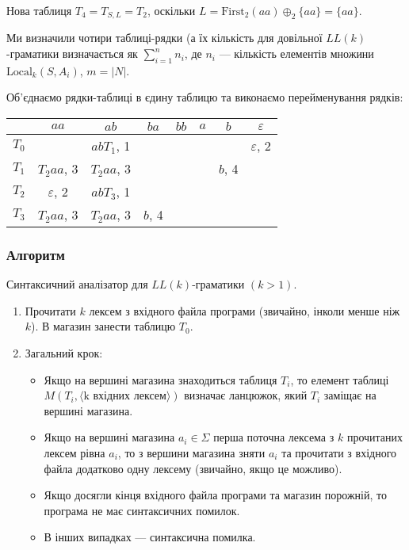Нова таблиця $T_4 = T_{S, L} = T_2$, оскільки $L = \text{First}_2(aa) \oplus_2 \{aa\} = \{aa\}$. \medskip

Ми визначили чотири таблиці-рядки (а їх кількість для довільної $LL(k)$-граматики визначається як $\sum_{i = 1}^n n_i$, де $n_i$ --- кількість елементів множини $\text{Local}_k(S, A_i)$, $m = \vert N\vert$. \medskip

Об'єднаємо рядки-таблиці в єдину таблицю та виконаємо перейменування рядків:

\begin{table}[H]
	\centering
	\begin{tabular}{|c|c|c|c|c|c|c|c|}
		\hline
		 & $aa$ & $ab$ & $ba$ & $bb$ & $a$ & $b$ & $\varepsilon$ \\ \hline
		$T_0$ &  & $abT_1$, 1 &  &  &  &  & $\varepsilon$, 2 \\ \hline
		$T_1$ & $T_2aa$, 3 & $T_2aa$, 3 &  &  &  & $b$, 4 &  \\ \hline
		$T_2$ & $\varepsilon$, 2 & $abT_3$, 1 &  &  &  &  &  \\ \hline
		$T_3$ & $T_2aa$, 3 & $T_2aa$, 3 & $b$, 4 &  &  &  &  \\ \hline
	\end{tabular}
\end{table}
\subsubsection{Алгоритм}

Синтаксичний аналізатор для $LL(k)$-граматики $(k > 1)$.
\begin{enumerate}
	\item Прочитати $k$ лексем з вхідного файла програми (звичайно, інколи менше ніж $k$). В магазин занести таблицю $T_0$.
	\item Загальний крок:
	\begin{itemize}
		\item Якщо на вершині магазина знаходиться таблиця $T_i$, то елемент таблиці $M(T_i, \langle \text{k вхідних лексем}\rangle)$ визначає ланцюжок, який $T_i$ заміщає на вершині магазина.
		\item Якщо на вершині магазина $a_i \in \Sigma$ перша поточна лексема з $k$ прочитаних лексем рівна $a_i$, то з вершини магазина зняти $a_i$ та прочитати з вхідного файла додатково одну лексему (звичайно, якщо це можливо).
		\item Якщо досягли кінця вхідного файла програми та магазин порожній, то програма не має синтаксичних помилок.
		\item В інших випадках --- синтаксична помилка.
	\end{itemize}
\end{enumerate}

